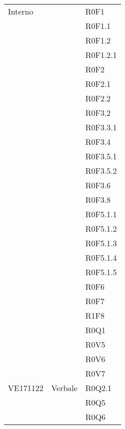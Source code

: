 \documentclass[AnalisiDeiRequisiti.tex]{subfiles}
\begin{document}
\begin{longtable}[H]{|p{2cm}|p{5cm}|p{5cm}|}
	Interno & & R0F1 \\
	& & R0F1.1 \\
	& & R0F1.2 \\
	& & R0F1.2.1 \\
	& & R0F2 \\
	& & R0F2.1 \\
	& & R0F2.2 \\
	& & R0F3.2 \\
	& & R0F3.3.1 \\
	& & R0F3.4 \\
	& & R0F3.5.1 \\
	& & R0F3.5.2 \\
	& & R0F3.6 \\
	& & R0F3.8 \\
	& & R0F5.1.1 \\
	& & R0F5.1.2 \\
	& & R0F5.1.3 \\
	& & R0F5.1.4 \\
	& & R0F5.1.5 \\
	& & R0F6 \\
	& & R0F7 \\
	& & R1F8 \\
	& & R0Q1 \\
	& & R0V5 \\
	& & R0V6 \\
	& & R0V7 \\ \hline
	
	VE171122 & Verbale & R0Q2.1 \\
	& & R0Q5 \\
	& & R0Q6 \\ \hline
	

\end{longtable}
\end{document}
